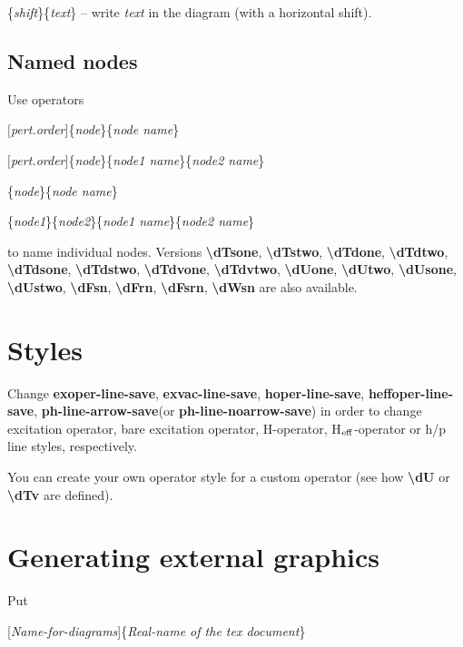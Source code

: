 \documentclass[a4paper]{article}
\newcommand{\myind}{\hspace{10pt}}
\begin{document}
\myind{\bf \textbackslash dtext}\{{\it shift}\}\{{\it text}\} -- write {\it text} in the diagram (with a horizontal shift).

\subsection{Named nodes}

Use operators

\myind{\bf \textbackslash dTone}$[${\it pert.order}$]$\{{\it node}\}\{{\it node name}\}

\myind{\bf \textbackslash dTtwo}$[${\it pert.order}$]$\{{\it node}\}\{{\it node1 name}\}\{{\it node2 name}\}

\myind{\bf \textbackslash dFn}\{{\it node}\}\{{\it node name}\}

\myind{\bf \textbackslash dWn}\{{\it node1}\}\{{\it node2}\}\{{\it node1 name}\}\{{\it node2 name}\}

to name individual nodes. Versions
{\bf \textbackslash dTsone},
{\bf \textbackslash dTstwo},
{\bf \textbackslash dTdone},
{\bf \textbackslash dTdtwo},
{\bf \textbackslash dTdsone},
{\bf \textbackslash dTdstwo},
{\bf \textbackslash dTdvone},
{\bf \textbackslash dTdvtwo},
{\bf \textbackslash dUone},
{\bf \textbackslash dUtwo},
{\bf \textbackslash dUsone},
{\bf \textbackslash dUstwo},
{\bf \textbackslash dFsn},
{\bf \textbackslash dFrn},
{\bf \textbackslash dFsrn},
{\bf \textbackslash dWsn}
are also available.

\section{Styles}\label{sec:Styles}

Change {\bf exoper-line-save}, {\bf exvac-line-save}, {\bf hoper-line-save}, {\bf heffoper-line-save}, 
{\bf ph-line-arrow-save}(or {\bf ph-line-noarrow-save}) in order to change excitation operator, 
bare excitation operator, H-operator, H$_{\rm eff}$-operator or h/p line styles, respectively.

You can create your own operator style for a custom operator (see how {\bf \textbackslash dU} or {\bf \textbackslash dTv} are 
defined).

\section{Generating external graphics}

Put 

\myind{\bf \textbackslash dsavediags}[{\it Name-for-diagrams}]\{{\it Real-name of the tex document}\}
\end{document}
